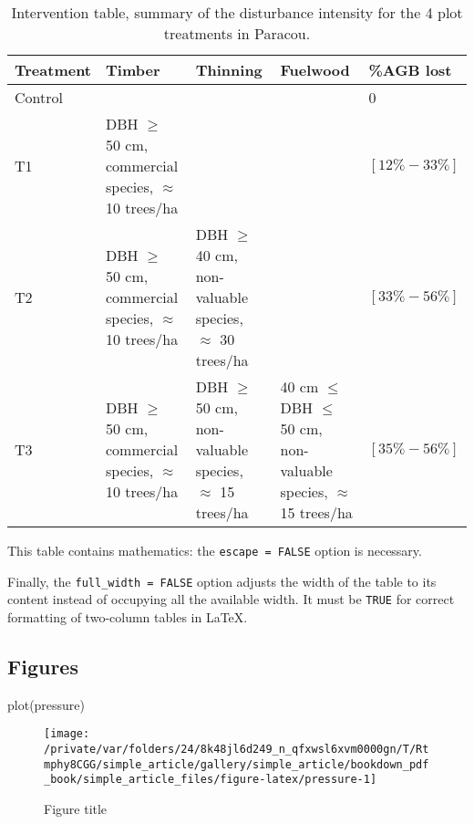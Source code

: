 \documentclass[fleqn,]{article} %
\newenvironment{Shaded}{\begin{snugshade}}{\end{snugshade}}
\newcommand{\FunctionTok}[1]{\textcolor[rgb]{0.00,0.00,0.00}{{#1}}}
\newcommand{\NormalTok}[1]{{#1}}
\begin{document}
\begin{table}

\caption{\label{tab:Paracou}Intervention table, summary of the disturbance intensity for the 4 plot treatments in Paracou.}
\centering
\begin{tabu} to 
\toprule
Treatment & Timber & Thinning & Fuelwood & \%AGB lost\\
\midrule
Control &  &  &  & 0\\
T1 & DBH $\geq$ 50 cm, commercial species, $\approx$ 10 trees/ha &  &  & $[12\%-33\%]$\\
T2 & DBH $\geq$ 50 cm, commercial species, $\approx$ 10 trees/ha & DBH $\geq$ 40 cm, non-valuable species, $\approx$ 30 trees/ha &  & $[33\%-56\%]$\\
T3 & DBH $\geq$ 50 cm, commercial species, $\approx$ 10 trees/ha & DBH $\geq$ 50 cm, non-valuable species, $\approx$ 15 trees/ha & 40 cm $\leq$ DBH $\leq$ 50 cm, non-valuable species, $\approx$ 15 trees/ha & $[35\%-56\%]$\\
\bottomrule
\end{tabu}
\end{table}

\normalsize

This table contains mathematics: the \texttt{escape\ =\ FALSE} option is necessary.

Finally, the \texttt{full\_width\ =\ FALSE} option adjusts the width of the table to its content instead of occupying all the available width.
It must be \texttt{TRUE} for correct formatting of two-column tables in LaTeX.

\hypertarget{figures}{%
\subsection{Figures}\label{figures}}

\scriptsize

\begin{Shaded}
\begin{Highlighting}[]
\FunctionTok{plot}\NormalTok{(pressure)}
\end{Highlighting}
\end{Shaded}

\begin{figure}

{\centering \texttt{[image: /private/var/folders/24/8k48jl6d249\_n\_qfxwsl6xvm0000gn/T/Rtmphy8CGG/simple\_article/gallery/simple\_article/bookdown\_pdf\_book/simple\_article\_files/figure-latex/pressure-1]} 

}

\caption{Figure title}\label{fig:pressure}
\end{figure}
\end{document}
